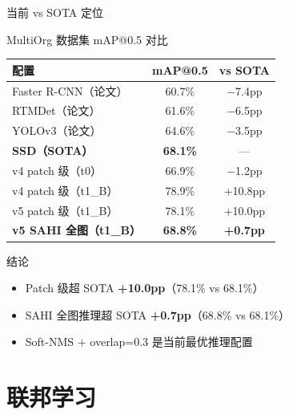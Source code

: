 \documentclass[aspectratio=169, 10pt]{beamer}
\begin{document}
\begin{frame}{当前 vs SOTA 定位}
  \begin{block}{MultiOrg 数据集 mAP@0.5 对比}
    \begin{tabular}{lcc}
      \toprule
      配置 & mAP@0.5 & vs SOTA \\
      \midrule
      Faster R-CNN（论文） & 60.7\% & $-$7.4pp \\
      RTMDet（论文） & 61.6\% & $-$6.5pp \\
      YOLOv3（论文） & 64.6\% & $-$3.5pp \\
      \textbf{SSD（SOTA）} & \textbf{68.1\%} & — \\
      \midrule
      v4 patch 级（t0） & 66.9\% & $-$1.2pp \\
      v4 patch 级（t1\_B） & 78.9\% & +10.8pp \\
      v5 patch 级（t1\_B） & 78.1\% & +10.0pp \\
      \textbf{v5 SAHI 全图（t1\_B）} & \textbf{68.8\%} & \textbf{+0.7pp} \\
      \bottomrule
    \end{tabular}
  \end{block}
  \vspace{0em}
  \begin{alertblock}{结论}
    \begin{itemize}
      \item Patch 级超 SOTA \textbf{+10.0pp}（78.1\% vs 68.1\%）
      \item SAHI 全图推理超 SOTA \textbf{+0.7pp}（68.8\% vs 68.1\%）
      \item Soft-NMS + overlap=0.3 是当前最优推理配置
    \end{itemize}
  \end{alertblock}
\end{frame}

\section{联邦学习}
\end{document}
